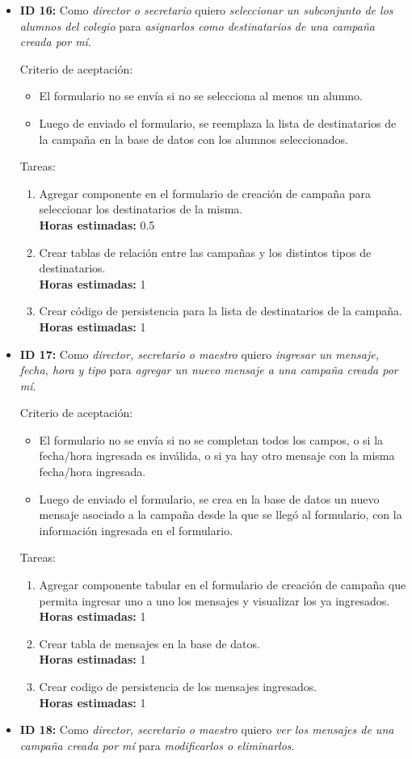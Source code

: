 \documentclass[a4paper, 10pt, twoside]{article}
\newenvironment{stories}{
  \begin{itemize}
}{
  \end{itemize}
}
\newcommand{\storyid}[4]{
  \item
  \textbf{ID #1:} Como \emph{#2} quiero \emph{#3} para \emph{#4}.
}
\newenvironment{tasks}{
  Tareas:
  \begin{enumerate}
}{
  \end{enumerate}
}
\newcommand{\task}[1] {
  \item #1.\\
  \textbf{Horas estimadas:}
}
\newenvironment{criterios}{
  Criterio de aceptación:
  \begin{itemize}
}{
  \end{itemize}
}
\newcommand{\criteria}[1] {
  \item #1
}
\begin{document}
\begin{stories}
  \begin{tasks}
    \task{Modificar componente de selección de destinatarios para sólo permitir seleccionar alumnos del maestro y/o sus padres cuando el usuario actual tenga el rol de maestro} 2
  \end{tasks}


  \storyid{16}
          {director o secretario}
          {seleccionar un subconjunto de los alumnos del colegio}
          {asignarlos como destinatarios de una campaña creada por mí}

  \begin{criterios}
    \criteria{El formulario no se envía si no se selecciona al menos un alumno.}
    \criteria{Luego de enviado el formulario, se reemplaza la lista de destinatarios de la campaña en la base de datos con los alumnos seleccionados.}
  \end{criterios}

  \begin{tasks}
    \task{Agregar componente en el formulario de creación de campaña para seleccionar los destinatarios de la misma} 0.5
    \task{Crear tablas de relación entre las campañas y los distintos tipos de destinatarios} 1
    \task{Crear código de persistencia para la lista de destinatarios de la campaña} 1
  \end{tasks}


  \storyid{17}{director, secretario o maestro}
              {ingresar un mensaje, fecha, hora y tipo}
              {agregar un nuevo mensaje a una campaña creada por mí}

  \begin{criterios}
    \criteria{El formulario no se envía si no se completan todos los campos, o si la fecha/hora ingresada es inválida, o si ya hay otro mensaje con la misma fecha/hora ingresada.}
    \criteria{Luego de enviado el formulario, se crea en la base de datos un nuevo mensaje asociado a la campaña desde la que se llegó al formulario, con la información ingresada en el formulario.}
  \end{criterios}

  \begin{tasks}
    \task{Agregar componente tabular en el formulario de creación de campaña que permita ingresar uno a uno los mensajes y visualizar los ya ingresados} 1
    \task{Crear tabla de mensajes en la base de datos} 1
    \task{Crear codigo de persistencia de los mensajes ingresados} 1
  \end{tasks}


  \storyid{18}
          {director, secretario o maestro}
          {ver los mensajes de una campaña creada por mí}
          {modificarlos o eliminarlos}


\end{stories}
\end{document}
